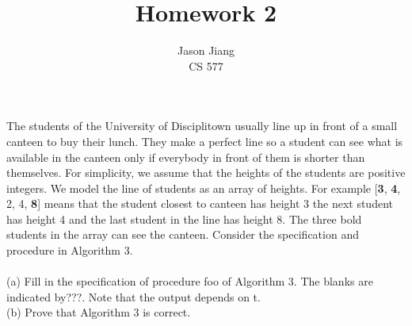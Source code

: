 \documentclass[12pt]{article}
\newenvironment{question}[2][Question]{\begin{trivlist}
\item[\hskip \labelsep {\bfseries #1}\hskip \labelsep {\bfseries #2.}]}{\end{trivlist}}
\begin{document}
 

\title{Homework 2}
\author{Jason Jiang\\ 
CS 577} 
 
\maketitle
 
\begin{question}{1} 
    The students of the University of Disciplitown usually line up in front of a small canteen to buy their lunch. They make a perfect line so a student can  see what is available in the canteen only if everybody in front of them is shorter than themselves. For simplicity, we assume that the heights of the students are positive integers. We model the line of students as an array of heights. For example [\textbf{3}, \textbf{4}, 2, 4, \textbf{8}] means that the student closest to canteen has height 3 the next student has height 4 and the last student in the line has height 8. The three bold students in the array can see the canteen. Consider the specification and procedure in Algorithm 3. \\
    \\
    (a) Fill in the specification of procedure foo of Algorithm 3. The blanks are indicated by???. Note that the output depends on t.\\
    (b) Prove that Algorithm 3 is correct.
\end{question}
 
\end{document}
